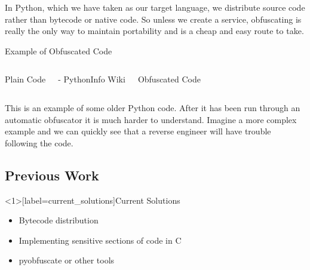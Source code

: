 In Python, which we have taken as our target language, we distribute source code rather than bytecode or native code. So unless we create a service, obfuscating 
is really the only way to maintain portability and is a cheap and easy route to take.

\begin{frame}[fragile, label=pyobf_example]{Example of Obfuscated Code}
\begin{columns}[t]
\begin{block}{Plain Code}

\end{block}
- PythonInfo Wiki

\pause

\begin{block}{Obfuscated Code}

\end{block}
\end{columns}
\end{frame}

This is an example of some older Python code. After it has been run through an automatic obfuscator it is much harder to understand. Imagine a more complex example
and we can quickly see that a reverse engineer will have trouble following the code.

\subsection{Previous Work}

\begin{frame}<1>[label=current_solutions]{Current Solutions}
\begin{itemize}
\item Bytecode distribution
\item Implementing sensitive sections of code in C
\item pyobfuscate or other tools
\end{itemize}
\end{frame}

